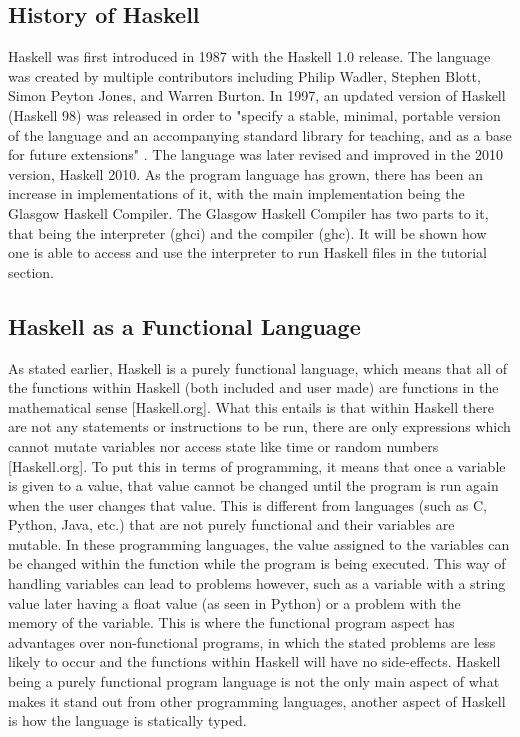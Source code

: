 \documentclass{article}
\begin{document}
\medskip\noindent %
\subsection{History of Haskell}
 Haskell was first introduced in 1987 with the Haskell 1.0 release.
The language was created by multiple contributors including Philip Wadler, Stephen Blott, Simon Peyton Jones, and Warren Burton.
In 1997, an updated version of Haskell (Haskell 98) was released in order to "specify a stable, minimal, portable version of the language and an accompanying standard library for teaching, and as a base for future extensions" \cite{1}.
The language was later revised and improved in the 2010 version, Haskell 2010.
As the program language has grown, there has been an increase in implementations of it, with the main implementation being the Glasgow Haskell Compiler.
The Glasgow Haskell Compiler has two parts to it, that being the interpreter (ghci) and the compiler (ghc).
It will be shown how one is able to access and use the interpreter to run Haskell files in the tutorial section.
\medskip\noindent
\subsection{Haskell as a Functional Language}
As stated earlier, Haskell is a purely functional language, which means that all of the functions within Haskell (both included and user made) are functions in the mathematical sense \cite{2} [Haskell.org]. 
What this entails is that within Haskell there are not any statements or instructions to be run, there are only expressions which cannot mutate variables nor access state like time or random numbers\cite{2} [Haskell.org].
To put this in terms of programming, it means that once a variable is given to a value, that value cannot be changed until the program is run again when the user changes that value.
This is different from languages (such as C, Python, Java, etc.) that are not purely functional and their variables are mutable.
In these programming languages, the value assigned to the variables can be changed within the function while the program is being executed.
This way of handling variables can lead to problems however, such as a variable with a string value later having a float value (as seen in Python) or a problem with the memory of the variable.
This is where the functional program aspect has advantages over non-functional programs, in which the stated problems are less likely to occur and the functions within Haskell will have no side-effects.
Haskell being a purely functional program language is not the only main aspect of what makes it stand out from other programming languages, another aspect of Haskell is how the language is statically typed.
\end{document}
